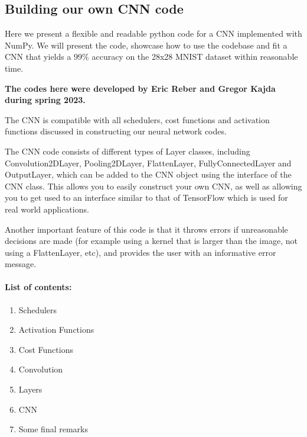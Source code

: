 \documentclass[%
oneside,                 %
final,                   %
10pt]{article}
\begin{document}
\subsection{Building our own CNN code}

Here we present a flexible and readable python code for a CNN
implemented with NumPy. We will present the code, showcase how to use
the codebase and fit a CNN that yields a 99\% accuracy on the 28x28
MNIST dataset within reasonable time.

\textbf{The codes here were developed by Eric Reber and Gregor Kajda during spring 2023.}

The CNN is compatible with all schedulers, cost functions and
activation functions discussed in constructing our neural network
codes.

 The CNN code consists of different types of Layer classes, including
Convolution2DLayer, Pooling2DLayer, FlattenLayer, FullyConnectedLayer
and OutputLayer, which can be added to the CNN object using the
interface of the CNN class. This allows you to easily construct your
own CNN, as well as allowing you to get used to an interface similar
to that of TensorFlow which is used for real world applications. 

Another important feature of this code is that it throws errors if
unreasonable decisions are made (for example using a kernel that is
larger than the image, not using a FlattenLayer, etc), and provides
the user with an informative error message.

\paragraph{List of contents:}
\begin{enumerate}
\item Schedulers

\item Activation Functions

\item Cost Functions 

\item Convolution

\item Layers

\item CNN 

\item Some final remarks
\end{enumerate}

\noindent
\end{document}
